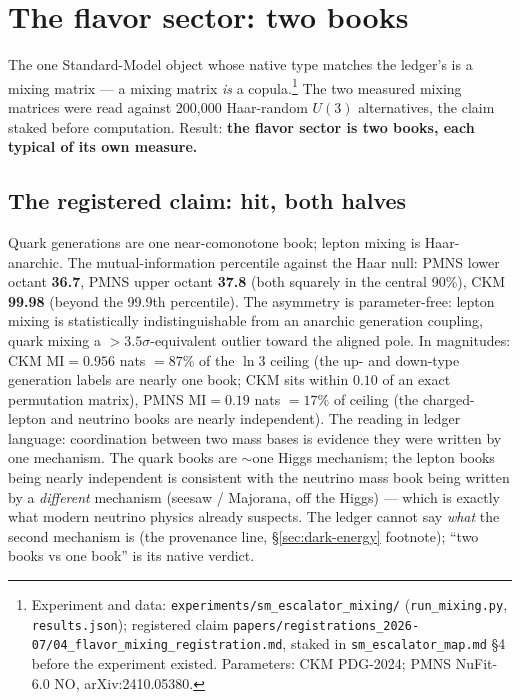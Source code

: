 \documentclass[11pt,a4paper]{article}
\begin{document}
\section{The flavor sector: two books}\label{sec:flavor}

The one Standard-Model object whose native type matches the ledger's is a mixing matrix --- a mixing matrix \emph{is} a copula.\footnote{Experiment and data: \texttt{experiments/sm\_escalator\_mixing/} (\texttt{run\_mixing.py}, \texttt{results.json}); registered claim \texttt{papers/registrations\_2026-07/04\_flavor\_mixing\_registration.md}, staked in \texttt{sm\_escalator\_map.md} \S4 before the experiment existed. Parameters: CKM PDG-2024; PMNS NuFit-6.0 NO, arXiv:2410.05380.} The two measured mixing matrices were read against 200{,}000 Haar-random $U(3)$ alternatives, the claim staked before computation. Result: \textbf{the flavor sector is two books, each typical of its own measure.}

\subsection*{The registered claim: hit, both halves}

Quark generations are one near-comonotone book; lepton mixing is Haar-anarchic. The mutual-information percentile against the Haar null: PMNS lower octant \textbf{36.7}, PMNS upper octant \textbf{37.8} (both squarely in the central 90\%), CKM \textbf{99.98} (beyond the 99.9th percentile). The asymmetry is parameter-free: lepton mixing is statistically indistinguishable from an anarchic generation coupling, quark mixing a $>3.5\sigma$-equivalent outlier toward the aligned pole. In magnitudes: CKM $\mathrm{MI} = 0.956$ nats $= 87\%$ of the $\ln 3$ ceiling (the up- and down-type generation labels are nearly one book; CKM sits within $0.10$ of an exact permutation matrix), PMNS $\mathrm{MI} = 0.19$ nats $= 17\%$ of ceiling (the charged-lepton and neutrino books are nearly independent). The reading in ledger language: coordination between two mass bases is evidence they were written by one mechanism. The quark books are $\sim$one Higgs mechanism; the lepton books being nearly independent is consistent with the neutrino mass book being written by a \emph{different} mechanism (seesaw / Majorana, off the Higgs) --- which is exactly what modern neutrino physics already suspects. The ledger cannot say \emph{what} the second mechanism is (the provenance line, \S\ref{sec:dark-energy} footnote); ``two books vs one book'' is its native verdict.
\end{document}
